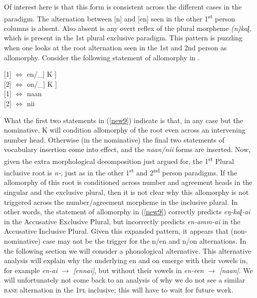 \documentclass[output=paper]{langscibook}
\begin{document}
Of interest here is that this form is consistent across the different cases in the paradigm. The alternation between [n] and [en] seen in the other 1\textsuperscript{st} person columns is absent. Also absent is any overt reflex of the plural morpheme \textit{(n)kaɭ}, which is present in the 1st plural exclusive paradigm. This pattern is puzzling when one looks at the root alternation seen in the 1st and 2nd person as allomorphy. Consider the following statement of allomorphy in \citet[306]{moskal2016towards}.

\begin{exe}
\ex \label{new9}
$[$1$]$ \hspace{6pt} $\Leftrightarrow$  \hspace{5pt}    en/\_] K ] \\
$[$2$]$ \hspace{5pt} $\Leftrightarrow$  \hspace{5pt}    on/\_] K ] \\
$[$1$]$ \hspace{6pt} $\Leftrightarrow$  \hspace{5pt}  naan\\
$[$2$]$ \hspace{5pt} $\Leftrightarrow$  \hspace{5pt}  nii\\
\end{exe}

What the first two statements in (\ref{new9}) indicate is that, in any case but the nominative, K will condition allomorphy of the root even across an intervening number head. Otherwise (in the nominative) the final two statements of vocabulary insertion come into effect, and the \textit{naan/nii} forms are inserted. Now, given the extra morphological decomposition just argued for, the 1\textsuperscript{st} Plural inclusive root is\textit{ n-}, just as in the other 1\textsuperscript{st} and 2\textsuperscript{nd} person paradigms. If the allomorphy of this root is conditioned across number and agreement heads in the singular and the exclusive plural, then it is not clear why this allomorphy is not triggered across the number/agreement morpheme in the inclusive plural. In other words, the statement of allomorphy in (\ref{new9}) correctly predicts \textit{eŋ-kaɭ-ai} in the Accusative Exclusive Plural, but incorrectly predicts	 \textit{en-amm-ai} in the Accusative Inclusive Plural. Given this expanded pattern, it appears that (non-nominative) case may not be the trigger for the n/en and n/on alternations. In the following section we will consider a phonological alternative. This alternative analysis will explain why the underlying en and on emerge with their vowels in, for example \textit{en-ai $\rightarrow$ [ennai]}, but without their vowels in \textit{en-een $\rightarrow$ [naan]}. We will unfortunately not come back to an analysis of why we do not see a similar \textsc{base} alternation in the 1\textsc{pl} inclusive; this will have to wait for future work.
\end{document}
